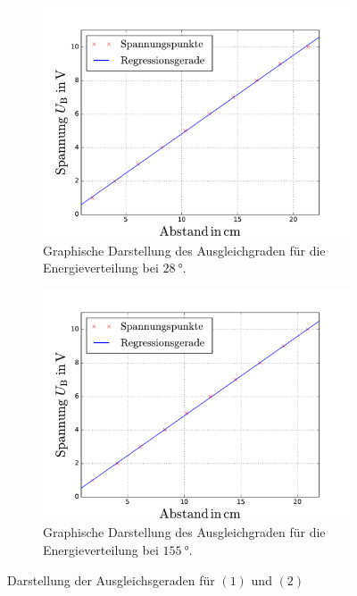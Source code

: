 \begin{figure}
  \centering
  \begin{subfigure}{0.48\textwidth}
    \centering
    \includegraphics[width=1 \textwidth]{../Messdaten/zim.pdf}
    \caption{Graphische Darstellung des Ausgleichgraden für die Energieverteilung bei $\SI{28}{\degree}$.} %
    \label{fig: energie_zim}
  \end{subfigure}
  \begin{subfigure}{0.48\textwidth}
    \centering
    \includegraphics[width=1 \textwidth]{../Messdaten/spannungsfit_energieverteilung_150grad.pdf}
    \caption{Graphische Darstellung des Ausgleichgraden für die Energieverteilung bei $\SI{155}{\degree}$.} %
    \label{fig: enrgie_hot}
  \end{subfigure}
  \caption{Darstellung der Ausgleichsgeraden für $(1)$ und $(2)$}
  \label{fig: darstellung_1}
\end{figure}
